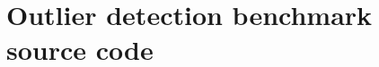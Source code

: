 \chapter{Outlier detection benchmark source code}
\label{app-outlier-detection-source}
\inputminted[breaklines=true]{java}{B01-code-outlier.java}
